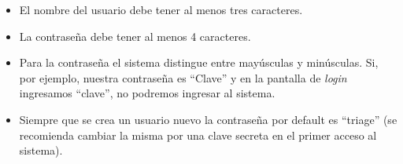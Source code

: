 \begin{itemize}
\item El nombre del usuario debe tener al menos tres caracteres.
\item La contraseña debe tener al menos 4 caracteres.
\item Para la contraseña el sistema distingue entre mayúsculas y minúsculas. Si, por ejemplo, nuestra contraseña es ``Clave'' y en la pantalla de \textit{login} ingresamos ``clave'', no podremos ingresar al sistema.
\item Siempre que se crea un usuario nuevo la contraseña por default es ``triage'' (se recomienda cambiar la misma por una clave secreta en el primer acceso al sistema).
\end{itemize}